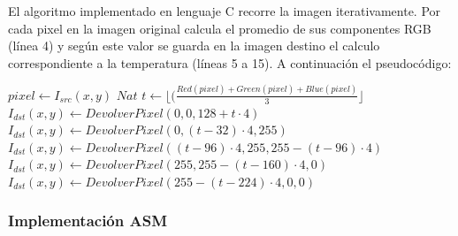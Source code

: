 El algoritmo implementado en lenguaje C recorre la imagen iterativamente. Por cada pixel en la imagen original calcula el promedio de sus componentes RGB (línea 4) y según este valor se guarda en la imagen destino el calculo correspondiente a la temperatura (líneas 5 a 15). A continuación el pseudocódigo:
	
\begin{algorithm}[H]
  \begin{algorithmic}[1]
				\STATE $ pixel \gets I_{src}(x,y)$
				\STATE $Nat $ $ t \gets \lfloor(\frac{Red(pixel)+Green(pixel)+Blue(pixel)}{3}\rfloor$
					\STATE $I_{dst}(x,y) \gets DevolverPixel(0,0,128+t \cdot 4)$
					\STATE $I_{dst}(x,y) \gets DevolverPixel(0,(t-32) \cdot 4,255)$
					\STATE $I_{dst}(x,y) \gets DevolverPixel((t-96) \cdot 4,255, 255-(t-96) \cdot 4)$
					\STATE $I_{dst}(x,y) \gets DevolverPixel(255, 255-(t-160) \cdot 4, 0)$
				\ELSE		
					\STATE $I_{dst}(x,y) \gets DevolverPixel(255-(t-224) \cdot 4, 0, 0)$
				\ENDIF	
			\ENDFOR
		 \ENDFOR
  \end{algorithmic}
  \caption{$temperature (I_{src}, I_{dst})$}
  \label{alg:temperature}
\end{algorithm}	

\subsubsection{Implementación ASM}